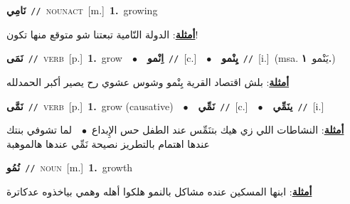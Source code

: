 \documentclass[10pt,a4paper,twoside]{article} %
\begin{document}
\begin{multicols}{2}
{\setlength\topsep{0pt}\textbf{\foreignlanguage{arabic}{نَامِي}}\ {\color{gray}\texttt{//}\color{black}}\ \textsc{noun\textunderscore act}\ [m.]\ \textbf{1.}~growing\  \begin{flushright}\color{gray}\foreignlanguage{arabic}{\textbf{\underline{\foreignlanguage{arabic}{أمثلة}}}: الدولة النّامية تبعتنا شو متوقع منها تكون!}\end{flushright}\color{black}} \vspace{2mm}

{\setlength\topsep{0pt}\textbf{\foreignlanguage{arabic}{نَمَى}}\ {\color{gray}\texttt{//}\color{black}}\ \textsc{verb}\ [p.]\ \textbf{1.}~grow\ \ $\bullet$\ \ \setlength\topsep{0pt}\textbf{\foreignlanguage{arabic}{اِنْمو}}\ {\color{gray}\texttt{//}\color{black}}\ [c.]\ \ $\bullet$\ \ \setlength\topsep{0pt}\textbf{\foreignlanguage{arabic}{يِنْمو}}\ {\color{gray}\texttt{//}\color{black}}\ [i.]\ \color{gray}(msa. \foreignlanguage{arabic}{يَنْمو}~\foreignlanguage{arabic}{\textbf{١.}})\color{black}\  \begin{flushright}\color{gray}\foreignlanguage{arabic}{\textbf{\underline{\foreignlanguage{arabic}{أمثلة}}}: بلش اقتصاد القرية يِنْمو وشوس عشوي رح يصير أكبر الحمدلله}\end{flushright}\color{black}} \vspace{2mm}

{\setlength\topsep{0pt}\textbf{\foreignlanguage{arabic}{نَمَّى}}\ {\color{gray}\texttt{//}\color{black}}\ \textsc{verb}\ [p.]\ \textbf{1.}~grow (causative)\ \ $\bullet$\ \ \setlength\topsep{0pt}\textbf{\foreignlanguage{arabic}{نَمِّي}}\ {\color{gray}\texttt{//}\color{black}}\ [c.]\ \ $\bullet$\ \ \setlength\topsep{0pt}\textbf{\foreignlanguage{arabic}{ينَمِّي}}\ {\color{gray}\texttt{//}\color{black}}\ [i.]\  \begin{flushright}\color{gray}\foreignlanguage{arabic}{\textbf{\underline{\foreignlanguage{arabic}{أمثلة}}}: النشاطات اللي زي هيك بتنَمِّس عند الطفل حس الإِبداع\ $\bullet$\ \  لما تشوفي بنتك عندها اهتمام بالتطريز نصيحة نَمِّي عندها هالموهبة}\end{flushright}\color{black}} \vspace{2mm}

{\setlength\topsep{0pt}\textbf{\foreignlanguage{arabic}{نُمُو}}\ {\color{gray}\texttt{//}\color{black}}\ \textsc{noun}\ [m.]\ \textbf{1.}~growth\  \begin{flushright}\color{gray}\foreignlanguage{arabic}{\textbf{\underline{\foreignlanguage{arabic}{أمثلة}}}: ابنها المسكين عنده مشاكل بالنمو هلكوا أهله وهمي بياخذوه عدكاترة}\end{flushright}\color{black}} \vspace{2mm}


\end{multicols}
\end{document}
